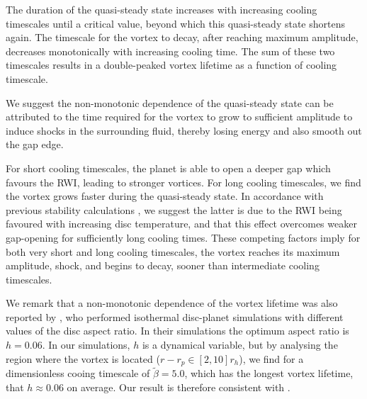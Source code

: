 The duration of the quasi-steady state increases with
increasing cooling timescales until a critical value, beyond which this
quasi-steady state shortens again. The timescale for the vortex to
decay, after reaching maximum amplitude, decreases monotonically with
increasing cooling time. The sum of these two timescales results in a
double-peaked vortex lifetime as a function of cooling
timescale. 


We suggest the non-monotonic dependence of the quasi-steady state can
be attributed to the time required for the vortex to grow to 
sufficient amplitude to induce shocks in the surrounding fluid,
thereby losing energy and also smooth out the gap edge.   

For short cooling timescales, the planet is able to open a
deeper gap which favours the RWI, leading to stronger 
vortices. For long cooling timescales, we find the vortex
grows faster during the quasi-steady state. In accordance with
previous stability calculations \citep{li00}, we 
suggest the latter is due to the RWI being favoured with increasing
disc temperature, and that this effect overcomes weaker
gap-opening for sufficiently long cooling times. 
These competing factors imply
for both very short and long cooling timescales, the vortex reaches
its maximum amplitude, shock, and begins to decay, sooner than
intermediate cooling timescales.      


We remark that a non-monotonic dependence of the vortex lifetime was
also reported by \cite{fu14}, who performed isothermal disc-planet
simulations with different values of the   
disc aspect ratio. In their simulations the optimum aspect ratio is
$h=0.06$. In our simulations, $h$ is a dynamical
variable, but by analysing the region where the vortex is located
($r-r_p\in[2,10]r_h$), %
we find for a dimensionless cooing timescale of $\tilde\beta=5.0$, which has
the longest vortex lifetime, that  
$h\approx0.06$ on average.  
Our result is therefore consistent with \citep{fu14}. 

